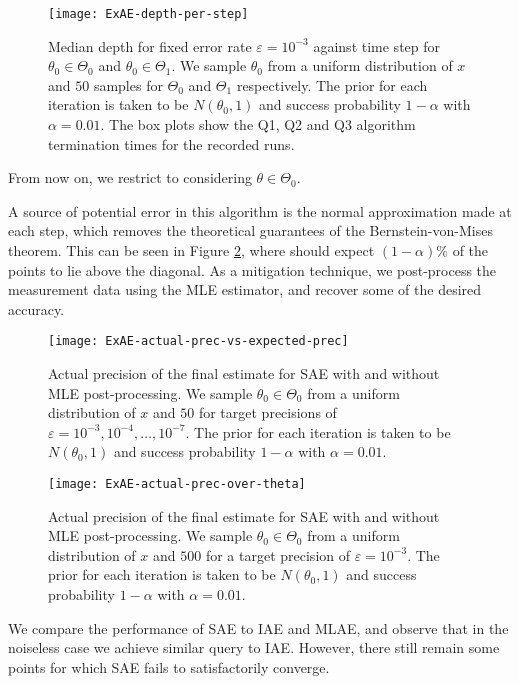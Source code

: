 \begin{figure}[htbp]
	\centering
	\texttt{[image: ExAE-depth-per-step]}
	\caption{Median depth for fixed error rate $\varepsilon = 10^{-3}$ against time step for $\theta_0 \in \Theta_0$ and $\theta_0 \in \Theta_1$. We sample $\theta_0$ from a uniform distribution of $x$ and $50$ samples for $\Theta_0$ and $ \Theta_1$ respectively. The prior for each iteration is taken to be $N(\theta_0, 1)$ and success probability $1 - \alpha$ with $\alpha = 0.01$. The box plots show the Q1, Q2 and Q3 algorithm termination times for the recorded runs.}
	\label{fig::ExAE-depth-per-step}
\end{figure}

From now on, we restrict to considering $\theta \in \Theta_0$.

A source of potential error in this algorithm is the normal approximation made at each step, which removes the theoretical guarantees of the Bernstein-von-Mises theorem. This can be seen in Figure \ref{fig::ExAE-actual-prec-vs-expected-prec}, where should expect $(1-\alpha)\%$ of the points to lie above the diagonal. As a mitigation technique, we post-process the measurement data using the MLE estimator, and recover some of the desired accuracy.

\begin{figure}[htbp]
	\centering
	\texttt{[image: ExAE-actual-prec-vs-expected-prec]}
	\caption{Actual precision of the final estimate for SAE with and without MLE post-processing. We sample $\theta_0 \in \Theta_0$ from a uniform distribution of $x$ and $50$ for target precisions of $\varepsilon = 10^{-3}, 10^{-4}, \ldots, 10^{-7} $. The prior for each iteration is taken to be $N(\theta_0, 1)$ and success probability $1 - \alpha$ with $\alpha = 0.01$.}
	\label{fig::ExAE-actual-prec-vs-expected-prec}
\end{figure}

\begin{figure}[htbp]
	\centering
	\texttt{[image: ExAE-actual-prec-over-theta]}
	\caption{Actual precision of the final estimate for SAE with and without MLE post-processing. We sample $\theta_0 \in \Theta_0$ from a uniform distribution of $x$ and $500$ for a target precision of $\varepsilon = 10^{-3}$. The prior for each iteration is taken to be $N(\theta_0, 1)$ and success probability $1 - \alpha$ with $\alpha = 0.01$.}
	\label{fig::ExAE-actual-prec-over-theta}
\end{figure}

We compare the performance of SAE to IAE and MLAE, and observe that in the noiseless case we achieve similar query to IAE. However, there still remain some points for which SAE fails to satisfactorily converge.

